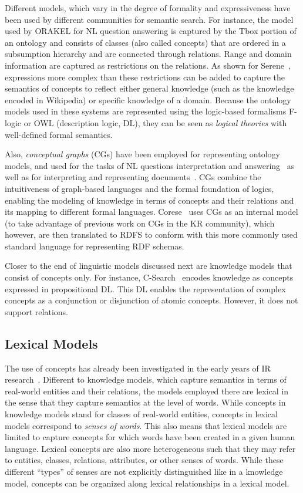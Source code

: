 Different models, which vary in the degree of formality and expressiveness have been used by different communities for semantic search. For instance, the model used by ORAKEL for NL question answering is captured by the Tbox portion of an ontology and consists of classes (also called concepts) that are ordered in a subsumption hierarchy and are connected through relations. Range and domain information are captured as restrictions on the relations. As shown for Serene~\cite{DBLP:journals/ws/FazzingaGGL11}, expressions more complex than these restrictions can be added to capture the semantics of concepts to reflect either general knowledge (such as the knowledge encoded in Wikipedia)
or specific knowledge of a domain. Because the ontology models used in these systems are represented using the logic-based formalisms F-logic or OWL (description logic, DL), they can be seen as \emph{logical theories} with well-defined formal semantics. 

Also, \emph{conceptual graphs} (CGs) have been employed for representing ontology models, and used for the tasks of NL questions interpretation and answering~\cite{DBLP:conf/aswc/CaoCT08} as well as for interpreting and representing documents~\cite{DBLP:conf/iccs/ComparotHH07}. CGs combine the intuitiveness of graph-based languages and the formal foundation of logics, enabling the modeling of knowledge in terms of concepts and their relations and its mapping to different formal languages. Corese~\cite{DBLP:conf/ecai/CorbyDF04} uses CGs as an internal model (to take advantage of previous work on CGs in the KR community), which however, are then translated to RDFS to conform with this more commonly used standard language for representing RDF schemas. 

Closer to the end of linguistic models discussed next are knowledge models that consist of concepts only. For instance, C-Search~\cite{DBLP:conf/esws/GiunchigliaKZ09} encodes knowledge as concepts expressed in propositional DL. This DL enables the representation of complex concepts as a conjunction or disjunction of atomic concepts. However, it does not support relations. 

		
\subsection{Lexical Models} The use of concepts has already been investigated in the early years of IR research~\cite{DBLP:conf/sigir/Giger88}. Different to knowledge models, which capture semantics in terms of real-world entities and their relations, the models employed there are lexical in the sense that they capture semantics at the level of words. While concepts in knowledge models stand for classes of real-world entities, concepts in lexical models correspond to \emph{senses of words}. This also means that lexical models are limited to capture concepts for which words have been created in a given human language. Lexical concepts are also more heterogeneous such that they may refer to entities, classes, relations, attributes, or other senses of words. While these different ``types'' of senses are not explicitly distinguished like in a knowledge model, concepts can be organized along lexical relationships in a lexical model. 

